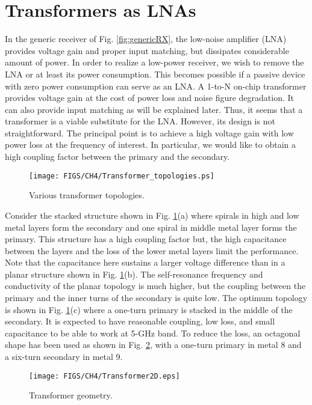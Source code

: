 \section{Transformers as LNAs}
In the generic receiver of Fig. \ref{fig:genericRX}, the low-noise amplifier (LNA) provides voltage gain and proper input matching, but dissipates
considerable amount of power. In order to realize a low-power receiver, we wish to remove the LNA or at least its power consumption. This becomes
possible if a passive device with zero power consumption can serve as an LNA. A 1-to-N on-chip transformer provides voltage gain at the cost of power
loss and noise figure degradation. It can also provide input matching as will be explained later. Thus, it seems that a transformer is a viable
substitute for the LNA. However, its design is not straightforward. The principal point is to achieve a high voltage gain with low power loss at the
frequency of interest. In particular, we would like to obtain a high coupling factor between the primary and the secondary. 
\begin{figure}[htb!]
\centering
\texttt{[image: FIGS/CH4/Transformer\_topologies.ps]}
\caption{Various transformer topologies.}
\label{fig:Transformer_topologies}
\end{figure}
Consider the stacked structure \cite{Zolfaghari2} shown in Fig. \ref{fig:Transformer_topologies}(a) where spirals in high and low metal layers form the
secondary and one spiral in middle metal layer forms the primary. This structure has a high coupling factor but, the high capacitance between the
layers and the loss of the lower metal layers limit the performance. Note that the capacitance here sustains a larger voltage difference than in a
planar structure \cite{Long} shown in Fig. \ref{fig:Transformer_topologies}(b). The self-resonance frequency and conductivity of the planar topology is
much higher, but the coupling between the primary and the inner turns of the secondary is quite low. The optimum topology is shown in Fig.
\ref{fig:Transformer_topologies}(c) where a one-turn primary is stacked in the middle of the secondary. It is expected to have reasonable coupling, low
loss, and small capacitance to be able to work at 5-GHz band. To reduce the loss, an octagonal shape has been used as shown in Fig.
\ref{fig:transformer}, with a one-turn primary in metal 8 and a six-turn secondary in metal 9.
\begin{figure}[htb!]
\centering
\texttt{[image: FIGS/CH4/Transformer2D.eps]}
\caption{Transformer geometry.}
\label{fig:transformer}
\end{figure}
